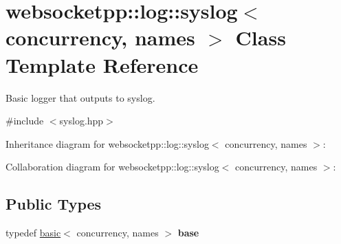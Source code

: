 \hypertarget{classwebsocketpp_1_1log_1_1syslog}{}\section{websocketpp\+:\+:log\+:\+:syslog$<$ concurrency, names $>$ Class Template Reference}
\label{classwebsocketpp_1_1log_1_1syslog}


Basic logger that outputs to syslog.  




{\ttfamily \#include $<$syslog.\+hpp$>$}



Inheritance diagram for websocketpp\+:\+:log\+:\+:syslog$<$ concurrency, names $>$\+:


Collaboration diagram for websocketpp\+:\+:log\+:\+:syslog$<$ concurrency, names $>$\+:
\subsection*{Public Types}
\begin{DoxyCompactItemize}
\item 
\mbox{\label{classwebsocketpp_1_1log_1_1syslog_af8dc65e20aafdace6b41c36983e6401f}} 
typedef \mbox{\hyperlink{classwebsocketpp_1_1log_1_1basic}{basic}}$<$ concurrency, names $>$ {\bfseries base}
\end{DoxyCompactItemize}
